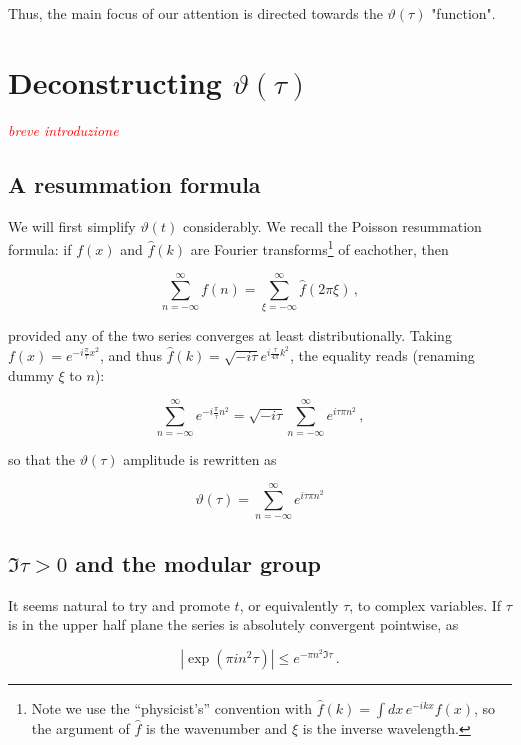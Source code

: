 \documentclass{article}
\newcommand{\T}{\ensuremath{\vartheta}}
\newcommand{\cmnt}[1]{\textcolor{red}{\emph{#1}}}
\newcommand{\sumZ}{\sum_{n=-\infty}^{\infty}}
\begin{document}
Thus, the main focus of our attention is directed towards the $\T(\tau)$ "function".


\section{Deconstructing $\T(\tau)$}

\cmnt{breve introduzione}

\subsection{A resummation formula}\label{resummation}

We will first simplify $\T(t)$ considerably. We recall the Poisson resummation formula: if $f(x)$ and $\hat f(k)$ are Fourier transforms\footnote{Note we use the ``physicist's'' convention with $\hat f(k) = \int dx\, e^{-ikx} f(x)$, so the argument of $\hat f$ is the wavenumber and $\xi$ is the inverse wavelength.} of eachother, then

\begin{equation}
    \sumZ f(n) = \sum_{\xi=-\infty}^{\infty} \hat f(2\pi\xi)\,,
\end{equation}

provided any of the two series converges at least distributionally. Taking $f(x) = e^{-i\frac{\pi}{\tau} x^2 }$, and thus $\hat f(k) = \sqrt{-i\tau} e^{i \frac{\tau}{4\pi} k^2}$, the equality reads (renaming dummy $\xi$ to $n$):

\begin{equation}
    \sumZ e^{-i\frac{\pi}{\tau} n^2 } = \sqrt{-i\tau} \sumZ e^{i\tau\pi n^2} \,,
\end{equation}

so that the $\T(\tau)$ amplitude is rewritten as

\begin{equation}
    \T(\tau) = \sumZ e^{i\tau\pi n^2}
\end{equation}

\subsection{$\Im{\tau}>0$ and the modular group} \label{sec:modular}

It seems natural to try and promote $t$, or equivalently $\tau$, to complex variables. If $\tau$ is in the upper half plane the series is absolutely convergent pointwise, as

\begin{equation}
    | \exp(\pi i n^2 \tau) | \leq e^{-\pi n^2 \Im\tau}\,.
\end{equation}
\end{document}
